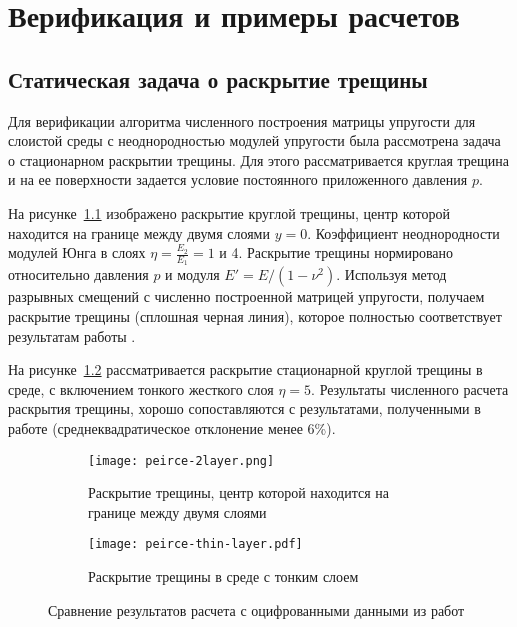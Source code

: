 \chapter{Верификация и примеры расчетов}
\label{sec:verification}

\section{Статическая задача о раскрытие трещины}
\label{sec:static-fracture}
Для верификации алгоритма численного построения матрицы упругости для слоистой среды с неоднородностью модулей упругости была рассмотрена задача о стационарном раскрытии трещины. Для этого рассматривается круглая трещина и на ее поверхности задается условие постоянного приложенного давления $p$. 

На рисунке~\ref{fig:peirce-2layer} изображено раскрытие круглой трещины, центр которой находится на границе между двумя слоями $y=0$. Коэффициент неоднородности модулей Юнга в слоях $\eta = \frac{E_2}{E_1} = 1$ и 4. Раскрытие трещины нормировано относительно давления $p$ и модуля $E' = E / (1-\nu^2)$. Используя метод разрывных смещений с численно построенной матрицей упругости, получаем раскрытие трещины (сплошная черная линия), которое полностью соответствует результатам работы \cite{Peirce2001UniformAA}.

На рисунке~\ref{fig:peirce-thin-layer} рассматривается раскрытие стационарной круглой трещины в среде, с включением тонкого жесткого слоя $\eta=5$. Результаты численного расчета раскрытия трещины, хорошо сопоставляются с результатами, полученными в работе \cite{Peirce2001TheSF} (среднеквадратическое отклонение менее 6\%).

\begin{figure}[htbp]
    \centering
    \begin{subfigure}[t]{0.4\textwidth}
        \centering
        \texttt{[image: peirce-2layer.png]}
        \caption{Раскрытие трещины, центр которой находится на границе между двумя слоями}
        \label{fig:peirce-2layer}
    \end{subfigure}
    \hfill 
    \begin{subfigure}[t]{0.55\textwidth}
        \centering
        \texttt{[image: peirce-thin-layer.pdf]}
        \caption{Раскрытие трещины в среде с тонким слоем}
        \label{fig:peirce-thin-layer}
    \end{subfigure}
    \caption{Сравнение результатов расчета с оцифрованными данными из работ \cite{Peirce2001UniformAA,Peirce2001TheSF}}
    \label{fig:comparison-peirce}
\end{figure}


